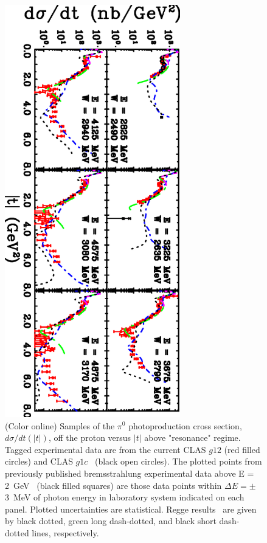 \documentclass[aps,prc,onecolumn,floatfix,showpacs,preprintnumbers,amsmath,amssymb,superscriptaddress]{revtex4-1}
\begin{document}
\begin{figure}[htb!]
\centerline{
        \includegraphics[width=3in, angle=90]{dsdt.eps}}

        \caption {(Color online) Samples of the $\pi^0$ 
		photoproduction cross section, $d\sigma/dt(|t|)$, 
		off the proton versus $|t|$ above "resonance" 
		regime.  Tagged experimental data are from the 
		current CLAS $g12$ (red filled circles) and CLAS 
		$g1c$~\protect\cite{du07} (black open circles). 
		The plotted points from previously published 
		bremsstrahlung experimental data above E = 
		2~GeV~\protect\cite{brem} (black filled squares) 
		are those data points within $\Delta E = \pm$3~MeV 
		of photon energy in laboratory system indicated on 
		each panel. Plotted uncertainties are statistical.  
		Regge results~\protect\cite{Goldstein,Mathieu,
		Donnachie} are given by black dotted, green 
		long dash-dotted, and black short dash-dotted
		lines, respectively.} \label{fig:t_data}
\end{figure}
\end{document}
